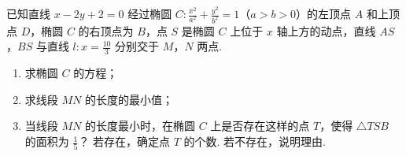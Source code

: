 \begin{problem}
已知直线 \(x - 2y + 2 = 0\) 经过椭圆 \(C: \frac{x^2}{a^2} + \frac{y^2}{b^2} = 1 \)（\(a > b > 0\)）的左顶点 \(A\) 和上顶点 \(D\)，椭圆 \(C\) 的右顶点为 \(B\)，点 \(S\) 是椭圆 \(C\) 上位于 \(x\) 轴上方的动点，直线 \(AS\)，\(BS\) 与直线 \(l: x = \frac{10}{3}\) 分别交于 \(M\)，\(N\) 两点.

\begin{enumerate}
\item 求椭圆 \(C\) 的方程；
\item 求线段 \(MN\) 的长度的最小值；
\item 当线段 \(MN\) 的长度最小时，在椭圆 \(C\) 上是否存在这样的点 \(T\)，使得 \(\triangle TSB\) 的面积为 \(\frac{1}{5}\)？ 若存在，确定点 \(T\) 的个数. 若不存在，说明理由.
\end{enumerate}


\end{problem}


